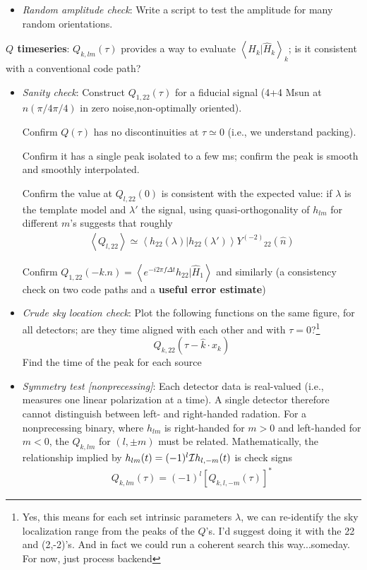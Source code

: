 \documentclass[twocolumn,prd,nofootinbib]{revtex4}
\newcommand\editremark[1]{{\color{red} #1}}
\newcommand\Y[1]{Y^{(#1)}{}}
\newcommand\qmstateproduct[2]{\left\langle#1|#2\right\rangle}
\begin{document}
\begin{widetext}
\begin{itemize}
\item \emph{Random amplitude check}: Write a script to test the amplitude for many random orientations.
\end{itemize}

\noindent \textbf{$Q$ timeseries}: $Q_{k,lm}(\tau)$ provides a way to evaluate $\qmstateproduct{H_k}{\hat{H}_k}_k$; is
it consistent with a conventional code path?  
\begin{itemize}
\item \emph{Sanity check}: Construct $Q_{1,22}(\tau)$ for a fiducial signal (4+4 Msun at $\hat{n}(\pi/4\pi/4)$ in zero
  noise,non-optimally oriented).


Confirm $Q(\tau)$ has no discontinuities at $\tau\simeq 0$ (i.e., we understand packing).

Confirm it has a single peak isolated to a few ms; confirm the peak is smooth and smoothly interpolated.

Confirm the  value at $Q_{l,22}(0)$ is consistent with the expected value: if $\lambda$ is the template model and
$\lambda'$ the signal, using quasi-orthogonality of $h_{lm}$ for different $m$'s suggests that roughly
\begin{eqnarray}
\left< Q_{l,22} \right> \simeq \qmstateproduct{h_{22}(\lambda)}{h_{22}(\lambda')}\Y{-2}_{22}(\hat{n})
\end{eqnarray}


Confirm $Q_{1,22}(-k.n) = \qmstateproduct{e^{-i2\pi f \Delta t}h_{22}}{\hat{H}_1}$ and similarly (a consistency check on
two code paths and a \textbf{useful error estimate})


\item \emph{Crude sky location check}: Plot the following functions on the same figure, for all detectors; are they time
  aligned with each other and with $\tau=0$?\footnote{Yes, this means for each set intrinsic parameters $\lambda$, we
    can re-identify the sky localization range from the peaks of the $Q$'s.  I'd suggest doing it with the 22 and
    (2,-2)'s.  And in fact we could run a coherent search this way...someday. For now, just process backend}
\[
Q_{k,22}(\tau-\hat{k}\cdot x_k)
\]
Find the time of the peak for each source

\item \emph{Symmetry test [nonprecessing]}: Each detector data is real-valued (i.e., measures one linear polarization at
  a time).   A single detector therefore cannot distinguish between left- and right-handed radation.  For a
  nonprecessing binary, where $h_{lm}$ is right-handed for $m>0$ and left-handed for $m<0$, the $Q_{k,lm}$ for  $(l,\pm
  m)$  must be related.  Mathematically, the relationship implied by $h_{lm}(t) = (-1)^l{\cal I}h_{l,-m}(t)$ is    \editremark{check signs}
\begin{eqnarray}
Q_{k,lm}(\tau) = (-1)^l [Q_{k,l,-m}(\tau)]^*
\end{eqnarray}


\end{itemize}
\end{widetext}
\end{document}
